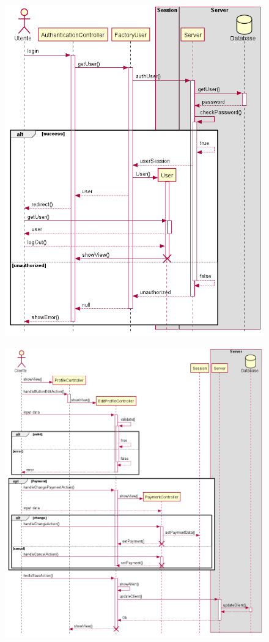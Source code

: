 \documentclass[12pt, a4paper]{report}
\begin{document}
\begin{figure}[H]
  \centering
  \includegraphics[width=\textwidth]{auth_sequence.png}
\end{figure}

\begin{figure}[H]
  \centering
  \includegraphics[width=\textwidth]{profile_sequence.png}
\end{figure}
\end{document}
